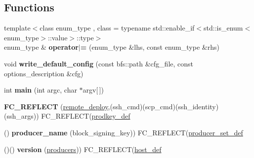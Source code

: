 \subsection*{Functions}
\begin{DoxyCompactItemize}
\item 
\mbox{\label{programs_2aacio-launcher_2main_8cpp_a982fad593d2be1b5f6b11f8b30be4748}} 
{\footnotesize template$<$class enum\+\_\+type , class  = typename std\+::enable\+\_\+if$<$std\+::is\+\_\+enum$<$enum\+\_\+type$>$\+::value$>$\+::type$>$ }\\enum\+\_\+type \& {\bfseries operator$\vert$=} (enum\+\_\+type \&lhs, const enum\+\_\+type \&rhs)
\item 
\mbox{\label{programs_2aacio-launcher_2main_8cpp_aae54f18181d7763de2b11b899440daeb}} 
void {\bfseries write\+\_\+default\+\_\+config} (const bfs\+::path \&cfg\+\_\+file, const options\+\_\+description \&cfg)
\item 
\mbox{\label{programs_2aacio-launcher_2main_8cpp_a0ddf1224851353fc92bfbff6f499fa97}} 
int {\bfseries main} (int argc, char $\ast$argv\mbox{[}$\,$\mbox{]})
\item 
\mbox{\label{programs_2aacio-launcher_2main_8cpp_a3b595e82066a2ece1bf6f8cda974aabf}} 
{\bfseries F\+C\+\_\+\+R\+E\+F\+L\+E\+CT} (\mbox{\hyperlink{structremote__deploy}{remote\+\_\+deploy}},(ssh\+\_\+cmd)(scp\+\_\+cmd)(ssh\+\_\+identity)(ssh\+\_\+args)) F\+C\+\_\+\+R\+E\+F\+L\+E\+CT(\mbox{\hyperlink{structprodkey__def}{prodkey\+\_\+def}}
\item 
\mbox{\label{programs_2aacio-launcher_2main_8cpp_aa2805b0c6af8d000490056866b205146}} 
() {\bfseries producer\+\_\+name} (block\+\_\+signing\+\_\+key)) F\+C\+\_\+\+R\+E\+F\+L\+E\+CT(\mbox{\hyperlink{structproducer__set__def}{producer\+\_\+set\+\_\+def}}
\item 
\mbox{\label{programs_2aacio-launcher_2main_8cpp_abfc341d484a10267ed71539e1ded4da3}} 
()() {\bfseries version} (\mbox{\hyperlink{structproducers}{producers}})) F\+C\+\_\+\+R\+E\+F\+L\+E\+CT(\mbox{\hyperlink{classhost__def}{host\+\_\+def}}

\end{DoxyCompactItemize}
